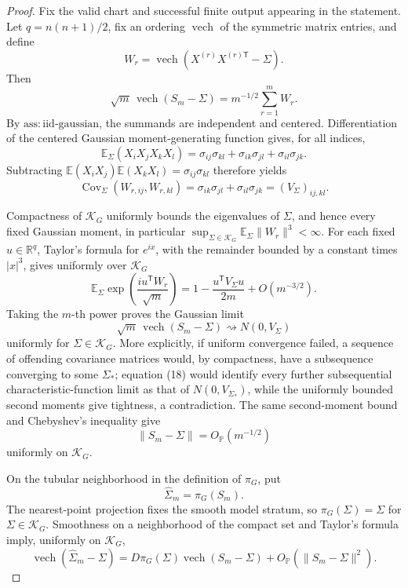\documentclass{article}
\begin{document}
\begin{proof}
Fix the valid chart and successful finite output appearing in the statement.  Let \(q=n(n+1)/2\), fix an ordering \(\operatorname{vech}\) of the symmetric matrix entries, and define
\[
 W_r=\operatorname{vech}\!\left(X^{(r)}X^{(r)\mathsf T}-\Sigma\right).
\]
Then
\[
 \sqrt m\,\operatorname{vech}(S_m-\Sigma)
 =m^{-1/2}\sum_{r=1}^m W_r.
\tag{15}
\]
By \(\mathrm{ass:iid\mbox{-}gaussian}\), the summands are independent and centered.  Differentiation of the centered Gaussian moment-generating function gives, for all indices,
\[
 \mathbb E_\Sigma(X_iX_jX_kX_l)
 =\sigma_{ij}\sigma_{kl}+\sigma_{ik}\sigma_{jl}+\sigma_{il}\sigma_{jk}.
\tag{16}
\]
Subtracting \(\mathbb E(X_iX_j)\mathbb E(X_kX_l)=\sigma_{ij}\sigma_{kl}\) therefore yields
\[
 \operatorname{Cov}_\Sigma(W_{r,ij},W_{r,kl})
 =\sigma_{ik}\sigma_{jl}+\sigma_{il}\sigma_{jk}
 =(V_\Sigma)_{ij,kl}.
\tag{17}
\]

Compactness of \(\mathcal K_G\) uniformly bounds the eigenvalues of \(\Sigma\), and hence every fixed Gaussian moment, in particular \(\sup_{\Sigma\in\mathcal K_G}\mathbb E_\Sigma\|W_r\|^3<\infty\).  For each fixed \(u\in\mathbb R^q\), Taylor's formula for \(e^{ix}\), with the remainder bounded by a constant times \(|x|^3\), gives uniformly over \(\mathcal K_G\)
\[
 \mathbb E_\Sigma\exp\!\left(\frac{i u^{\mathsf T}W_r}{\sqrt m}\right)
 =1-\frac{u^{\mathsf T}V_\Sigma u}{2m}+O(m^{-3/2}).
\tag{18}
\]
Taking the \(m\)-th power proves the Gaussian limit
\[
 \sqrt m\,\operatorname{vech}(S_m-\Sigma)
 \rightsquigarrow N(0,V_\Sigma)
\tag{19}
\]
uniformly for \(\Sigma\in\mathcal K_G\).  More explicitly, if uniform convergence failed, a sequence of offending covariance matrices would, by compactness, have a subsequence converging to some \(\Sigma_*\); equation (18) would identify every further subsequential characteristic-function limit as that of \(N(0,V_{\Sigma_*})\), while the uniformly bounded second moments give tightness, a contradiction.  The same second-moment bound and Chebyshev's inequality give
\[
 \|S_m-\Sigma\|=O_{\mathbb P}(m^{-1/2})
\tag{20}
\]
uniformly on \(\mathcal K_G\).

On the tubular neighborhood in the definition of \(\pi_G\), put
\[
 \widehat\Sigma_m=\pi_G(S_m).
\]
The nearest-point projection fixes the smooth model stratum, so \(\pi_G(\Sigma)=\Sigma\) for \(\Sigma\in\mathcal K_G\).  Smoothness on a neighborhood of the compact set and Taylor's formula imply, uniformly on \(\mathcal K_G\),
\[
 \operatorname{vech}(\widehat\Sigma_m-\Sigma)
 =D\pi_G(\Sigma)\operatorname{vech}(S_m-\Sigma)
 +O_{\mathbb P}(\|S_m-\Sigma\|^2).
\tag{21}
\]


\end{proof}
\end{document}
